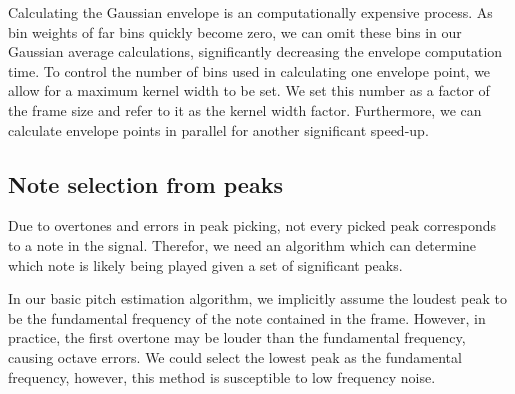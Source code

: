 \documentclass[a4paper,10pt,twocolumn]{article}
\begin{document}
Calculating the Gaussian envelope is an computationally expensive process. As bin weights of far bins quickly become zero, we can omit these bins in our Gaussian average calculations, significantly decreasing the envelope computation time. To control the number of bins used in calculating one envelope point, we allow for a maximum kernel width to be set. We set this number as a factor of the frame size and refer to it as the kernel width factor. Furthermore, we can calculate envelope points in parallel for another significant speed-up.




\subsection{Note selection from peaks}
Due to overtones and errors in peak picking, not every picked peak corresponds to a note in the signal. Therefor, we need an algorithm which can determine which note is likely being played given a set of significant peaks.

In our basic pitch estimation algorithm, we implicitly assume the loudest peak to be the fundamental frequency of the note contained in the frame. However, in practice, the first overtone may be louder than the fundamental frequency, causing octave errors. We could select the lowest peak as the fundamental frequency, however, this method is susceptible to low frequency noise.
\end{document}
